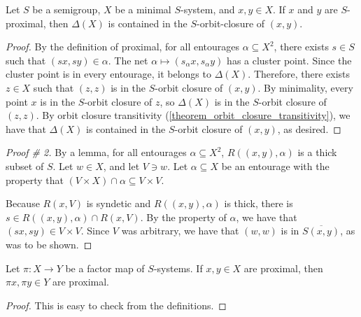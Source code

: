 \begin{theorem}
\label{theorem_proximal_and_minimal_implies_orbit_closure_contains_diagonal}
\leanok{}
    Let $S$ be a semigroup, $X$ be a minimal $S$-system, and $x, y \in X$.  If $x$ and $y$ are $S$-proximal, then $\Delta(X)$ is contained in the $S$-orbit-closure of $(x,y)$.
\end{theorem}

\begin{proof}
\leanok{}
    By the definition of proximal, for all entourages $\alpha \subseteq X^2$, there exists $s \in S$ such that $(sx,sy) \in \alpha$.  The net $\alpha \mapsto (s_\alpha x, s_\alpha y)$ has a cluster point.  Since the cluster point is in every entourage, it belongs to $\Delta(X)$.  Therefore, there exists $z \in X$ such that $(z,z)$ is in the $S$-orbit closure of $(x,y)$.  By minimality, every point $x$ is in the $S$-orbit closure of $z$, so $\Delta(X)$ is in the $S$-orbit closure of $(z,z)$.  By orbit closure transitivity (\cref{theorem_orbit_closure_transitivity}), we have that $\Delta(X)$ is contained in the $S$-orbit closure of $(x,y)$, as desired.
\end{proof}

\begin{proof}[Proof \# 2]
    By a lemma, for all entourages $\alpha \subseteq X^2$, $R((x,y),\alpha)$ is a thick subset of $S$.  Let $w \in X$, and let $V \ni w$.  Let $\alpha \subseteq X$ be an entourage with the property that $(V \times X) \cap \alpha \subseteq V \times V$. 

    Because $R(x,V)$ is syndetic and $R((x,y),\alpha)$ is thick, there is $s \in R((x,y), \alpha) \cap R(x,V)$.  By the property of $\alpha$, we have that $(sx,sy) \in V \times V$.  Since $V$ was arbitrary, we have that $(w,w)$ is in $\overline{S(x,y)}$, as was to be shown.
\end{proof}

\begin{theorem}
    \label{lemma_prox_pair_under_factor_map_is_prox}
    \leanok{}
    Let $\pi: X \to Y$ be a factor map of $S$-systems.  If $x, y \in X$ are proximal, then $\pi x, \pi y \in Y$ are proximal.
\end{theorem}

\begin{proof}
    \leanok{}
    This is easy to check from the definitions.
\end{proof}

